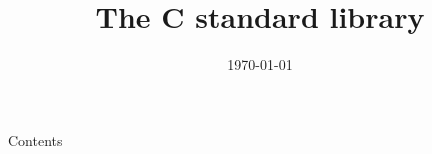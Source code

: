 
\newcommand{\topic}{
	The C standard library
}

\title{\topic}
\supertitle{\course}
\date{\today}



\maketitle

\begin{frame}{Contents}
	\tableofcontents
\end{frame}




